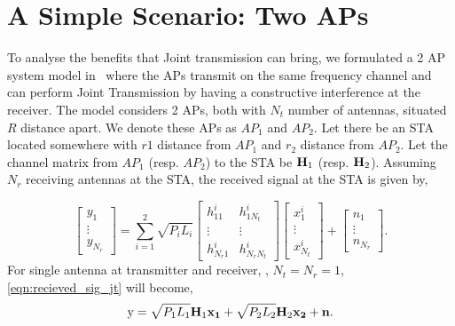\section{A Simple Scenario: Two APs}
\label{sec:2AP-model}
To analyse the benefits that Joint transmission can bring, we formulated a 2 AP system model in~\cite{JT_decision} where the APs transmit on the same frequency channel and can perform Joint Transmission by having a constructive interference at the receiver.
The model considers 2 APs, both with $N_t$ number of antennas, situated $R$ distance apart. We denote these APs as $AP_1$ and $AP_2$.
Let there be an STA located somewhere with $r1$ distance from $AP_1$ and $r_2$ distance from $AP_2$.
Let the channel matrix from $AP_1$ (resp. $AP_2$) to the STA be $\mathbf{H}_1$ (resp. $\mathbf{H}_2$).
Assuming $N_r$ receiving antennas at the STA, the received signal at the STA is given by,
%

\begin{equation}
\label{eqn:recieved_sig_jt}
    \begin{bmatrix}
        y_1\\
        \vdots\\
        y_{N_r}
    \end{bmatrix}
    =\sum_{i=1}^{2} \sqrt{P_iL_i} 
    \begin{bmatrix}
        h^i_{11} & h^i_{1N_t} \\ 
        \vdots & \vdots\\
        h^i_{N_r1} & h^i_{N_rN_t} 
    \end{bmatrix}
    \begin{bmatrix}
        x^i_1\\
        \vdots\\
        x^i_{N_t}
    \end{bmatrix}
    +
    \begin{bmatrix}
        n_1\\
        \vdots\\
        n_{N_r}
    \end{bmatrix}.
\end{equation}
For single antenna at transmitter and receiver, \ie, $N_t = N_r = 1$, \eqref{eqn:recieved_sig_jt} will become,
\begin{equation*}
    \text{y} = \sqrt{P_1L_1}\mathbf{H}_1\mathbf{x_1}+\sqrt{P_2L_2}\mathbf{H}_2\mathbf{x_2}+\mathbf{n}.
\end{equation*}

